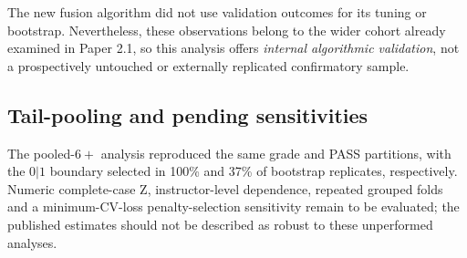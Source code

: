 The new fusion algorithm did not use validation outcomes for its tuning or bootstrap. Nevertheless, these observations belong to the wider cohort already examined in Paper 2.1, so this analysis offers \emph{internal algorithmic validation}, not a prospectively untouched or externally replicated confirmatory sample.

\subsection{Tail-pooling and pending sensitivities}
The pooled-$6+$ analysis reproduced the same grade and PASS partitions, with the $0|1$ boundary selected in 100\% and 37\% of bootstrap replicates, respectively. Numeric complete-case Z, instructor-level dependence, repeated grouped folds and a minimum-CV-loss penalty-selection sensitivity remain to be evaluated; the published estimates should not be described as robust to these unperformed analyses.
